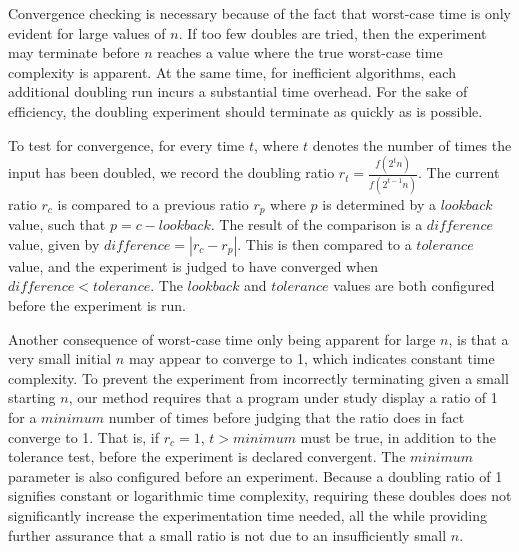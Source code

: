   Convergence checking is necessary because of the fact that worst-case time is only evident for large values of $n$.
  If too few doubles are tried, then the experiment may terminate before $n$ reaches a value where the true worst-case
  time complexity is apparent. At the same time, for inefficient  algorithms, each additional doubling run incurs a
  substantial time overhead. For the sake of efficiency, the doubling experiment should terminate as quickly as is possible.


  To test for convergence, for every time $t$, where $t$ denotes the number of times the input has been doubled, we
  record the doubling ratio $r_t = \frac{f(2^t n)}{f(2^{t-1}n)}$. The current ratio $r_c$ is compared to a previous
  ratio $r_p$ where $p$ is determined by a $\mathit{lookback}$ value, such that $p=c-\mathit{lookback}$.  The result of
  the comparison is a $\mathit{difference}$ value, given by $\mathit{difference} = |r_c - r_p|$.  This is then compared
  to a $\mathit{tolerance}$ value, and the experiment is judged to have converged when $\mathit{difference}<\mathit{tolerance}$.
  The $\mathit{lookback}$ and $\mathit{tolerance}$ values are both configured before the experiment is run.

  Another consequence of worst-case time only being apparent for large $n$, is that a very small initial $n$ may appear
  to converge to 1, which indicates constant time complexity. To prevent the experiment from incorrectly terminating
  given a small starting $n$, our method requires that a program under study display a ratio of 1 for a
  $\mathit{minimum}$ number of times before judging that the ratio does in fact converge to 1.  That is, if $r_c = 1$,
  $t > \mathit{minimum}$ must be true, in addition to the tolerance test, before the experiment is declared convergent.
  The $\mathit{minimum}$ parameter is also configured before an experiment.  Because a doubling ratio of 1 signifies
  constant or logarithmic time complexity, requiring these doubles does not significantly increase the experimentation
  time needed, all the while providing further assurance that a small ratio is not due to an insufficiently small $n$.
